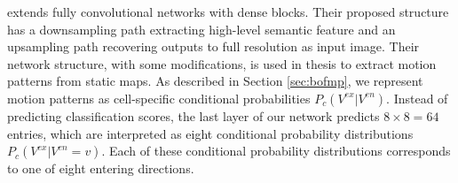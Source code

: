 \citet{jegou2017one} extends fully convolutional networks with dense blocks. Their proposed structure has a downsampling path extracting high-level semantic feature and an upsampling path recovering outputs to full resolution as input image. Their network structure, with some modifications, is used in thesis to extract motion patterns from static maps. As described in Section \ref{sec:bofmp}, we represent motion patterns as cell-specific conditional probabilities $P_c(V^{ex}|V^{en})$. Instead of predicting classification scores, the last layer of our network predicts $8\times8=64$ entries, which are interpreted as eight conditional probability distributions $P_c(V^{ex}|V^{en}=v)$. Each of these conditional probability distributions corresponds to one of eight entering directions. 
